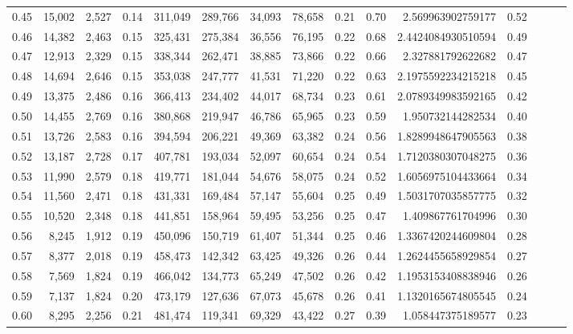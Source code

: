 \begin{tabular}{rrrrrrrrrrrrrrr}
0.45 &  15,002 &  2,527 &  0.14 &  311,049 &  289,766 &   34,093 &   78,658 &  0.21 &  0.70 &       2.569963902759177 &      0.52 \\
0.46 &  14,382 &  2,463 &  0.15 &  325,431 &  275,384 &   36,556 &   76,195 &  0.22 &  0.68 &      2.4424084930510594 &      0.49 \\
0.47 &  12,913 &  2,329 &  0.15 &  338,344 &  262,471 &   38,885 &   73,866 &  0.22 &  0.66 &       2.327881792622682 &      0.47 \\
0.48 &  14,694 &  2,646 &  0.15 &  353,038 &  247,777 &   41,531 &   71,220 &  0.22 &  0.63 &      2.1975592234215218 &      0.45 \\
0.49 &  13,375 &  2,486 &  0.16 &  366,413 &  234,402 &   44,017 &   68,734 &  0.23 &  0.61 &      2.0789349983592165 &      0.42 \\
0.50 &  14,455 &  2,769 &  0.16 &  380,868 &  219,947 &   46,786 &   65,965 &  0.23 &  0.59 &       1.950732144282534 &      0.40 \\
0.51 &  13,726 &  2,583 &  0.16 &  394,594 &  206,221 &   49,369 &   63,382 &  0.24 &  0.56 &      1.8289948647905563 &      0.38 \\
0.52 &  13,187 &  2,728 &  0.17 &  407,781 &  193,034 &   52,097 &   60,654 &  0.24 &  0.54 &      1.7120380307048275 &      0.36 \\
0.53 &  11,990 &  2,579 &  0.18 &  419,771 &  181,044 &   54,676 &   58,075 &  0.24 &  0.52 &      1.6056975104433664 &      0.34 \\
0.54 &  11,560 &  2,471 &  0.18 &  431,331 &  169,484 &   57,147 &   55,604 &  0.25 &  0.49 &      1.5031707035857775 &      0.32 \\
0.55 &  10,520 &  2,348 &  0.18 &  441,851 &  158,964 &   59,495 &   53,256 &  0.25 &  0.47 &       1.409867761704996 &      0.30 \\
0.56 &   8,245 &  1,912 &  0.19 &  450,096 &  150,719 &   61,407 &   51,344 &  0.25 &  0.46 &      1.3367420244609804 &      0.28 \\
0.57 &   8,377 &  2,018 &  0.19 &  458,473 &  142,342 &   63,425 &   49,326 &  0.26 &  0.44 &      1.2624455658929854 &      0.27 \\
0.58 &   7,569 &  1,824 &  0.19 &  466,042 &  134,773 &   65,249 &   47,502 &  0.26 &  0.42 &      1.1953153408838946 &      0.26 \\
0.59 &   7,137 &  1,824 &  0.20 &  473,179 &  127,636 &   67,073 &   45,678 &  0.26 &  0.41 &      1.1320165674805545 &      0.24 \\
0.60 &   8,295 &  2,256 &  0.21 &  481,474 &  119,341 &   69,329 &   43,422 &  0.27 &  0.39 &       1.058447375189577 &      0.23 \\

\end{tabular}
